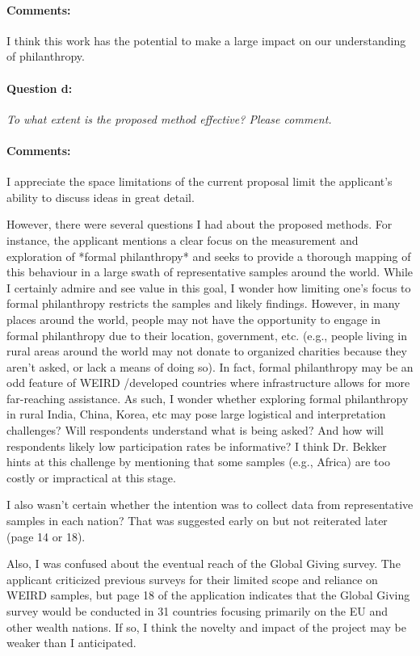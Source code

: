 \documentclass[twocolumn, serif, rga, numeric]{jote-article}
\begin{document}
\paragraph{Comments:}
I think this work has the potential to make a large impact on our understanding of philanthropy.
\paragraph{Question d:}
\textit{To what extent is the proposed method effective? Please comment.}
\paragraph{Comments:}
I appreciate the space limitations of the current proposal limit the applicant's ability to discuss ideas in great detail.

However, there were several questions I had about the proposed methods. For instance, the applicant mentions a clear focus on the measurement and exploration of *formal philanthropy* and seeks to provide a thorough mapping of this behaviour in a large swath of representative samples around the world. While I certainly admire and see value in this goal, I wonder how limiting one's focus to formal philanthropy restricts the samples and likely findings. However, in many places around the world, people may not have the opportunity to engage in formal philanthropy due to their location, government, etc. (e.g., people living in rural areas around the world may not donate to organized charities because they aren't asked, or lack a means of doing so). In fact, formal philanthropy may be an odd feature of WEIRD /developed countries where infrastructure allows for more far-reaching assistance. As such, I wonder whether exploring formal philanthropy in rural India, China, Korea, etc may pose large logistical and interpretation challenges? Will respondents understand what is being asked? And how will respondents likely low participation rates be informative? I think Dr. Bekker hints at this challenge by mentioning that some samples (e.g., Africa) are too costly or impractical at this stage.

I also wasn't certain whether the intention was to collect data from representative samples in each nation? That was suggested early on but not reiterated later (page 14 or 18).

Also, I was confused about the eventual reach of the Global Giving survey. The applicant criticized previous surveys for their limited scope and reliance on WEIRD samples, but page 18 of the application indicates that the Global Giving survey would be conducted in 31 countries focusing primarily on the EU and other wealth nations. If so, I think the novelty and impact of the project may be weaker than I anticipated.
\end{document}
